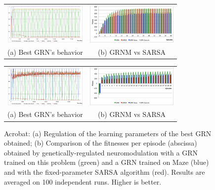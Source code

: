 \begin{figure}[b!]
\center
\begin{minipage}[t!]{0.49\linewidth}
\center
\setlength{\tabcolsep}{0.5mm}
\begin{tabular}{cc}
\includegraphics[height=2cm]{PW_GRNBehavior.pdf} &
\includegraphics[height=2cm]{PW_GRNvsSARSA.pdf} \\
(a) Best GRN's behavior &
(b) GRNM vs SARSA
\end{tabular}
\caption{Puddle World: (b) Comparison of the fitnesses per episode (abscissa) obtained by genetically-regulated neuromodulation with a GRN trained on this problem (green), a GRN trained on Maze (blue), a GRN trained on Maze and Mountain Car (gray) and with the fixed-parameter SARSA algorithm (red). Results are averaged on 100 independent runs. Higher is better.}\label{fig:PW:Results}
\end{minipage}
\hspace{1.5mm}
\begin{minipage}[t!]{0.49\linewidth}
\center
\setlength{\tabcolsep}{0.5mm}
\begin{tabular}{cc}
\includegraphics[height=2cm]{ACP_GRNBehavior.pdf} &
\includegraphics[height=2cm]{ACP_GRNvsSARSA.pdf} \\
(a) Best GRN's behavior &
(b) GRNM vs SARSA
\end{tabular}
\caption{Acrobat: (a) Regulation of the learning parameters of the best GRN obtained; (b) Comparison of the fitnesses per episode (abscissa) obtained by genetically-regulated neuromodulation with a GRN trained on this problem (green) and a GRN trained on Maze (blue) and with the fixed-parameter SARSA algorithm (red). Results are averaged on 100 independent runs. Higher is better. }\label{fig:ACP:Results}
\end{minipage}
\end{figure}

